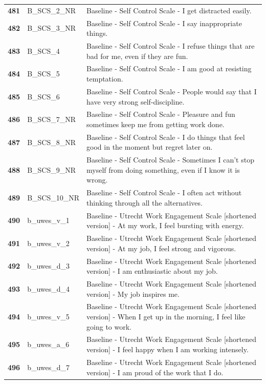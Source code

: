 \documentclass[
  letterpaper,
  DIV=11,
  numbers=noendperiod]{scrartcl}
\begin{document}
\begin{longtable}[t]{>{}cll}
\addlinespace
\textbf{481} & B\_SCS\_2\_NR & Baseline - Self Control Scale - I get distracted easily.\\
\textbf{482} & B\_SCS\_3\_NR & Baseline - Self Control Scale - I say inappropriate things.\\
\textbf{483} & B\_SCS\_4 & Baseline - Self Control Scale - I refuse things that are bad for me, even if they are fun.\\
\textbf{484} & B\_SCS\_5 & Baseline - Self Control Scale - I am good at resisting temptation.\\
\textbf{485} & B\_SCS\_6 & Baseline - Self Control Scale - People would say that I have very strong self-discipline.\\
\addlinespace
\textbf{486} & B\_SCS\_7\_NR & Baseline - Self Control Scale - Pleasure and fun sometimes keep me from getting work done.\\
\textbf{487} & B\_SCS\_8\_NR & Baseline - Self Control Scale - I do things that feel good in the moment but regret later on.\\
\textbf{488} & B\_SCS\_9\_NR & Baseline - Self Control Scale - Sometimes I can’t stop myself from doing something, even if I know it is wrong.\\
\textbf{489} & B\_SCS\_10\_NR & Baseline - Self Control Scale - I often act without thinking through all the alternatives.\\
\textbf{490} & b\_uwes\_v\_1 & Baseline - Utrecht Work Engagement Scale [shortened version] - At my work, I feel bursting with energy.\\
\addlinespace
\textbf{491} & b\_uwes\_v\_2 & Baseline - Utrecht Work Engagement Scale [shortened version] - At my job, I feel strong and vigorous.\\
\textbf{492} & b\_uwes\_d\_3 & Baseline - Utrecht Work Engagement Scale [shortened version] - I am enthusiastic about my job.\\
\textbf{493} & b\_uwes\_d\_4 & Baseline - Utrecht Work Engagement Scale [shortened version] - My job inspires me.\\
\textbf{494} & b\_uwes\_v\_5 & Baseline - Utrecht Work Engagement Scale [shortened version] - When I get up in the morning, I feel like going to work.\\
\textbf{495} & b\_uwes\_a\_6 & Baseline - Utrecht Work Engagement Scale [shortened version] - I feel happy when I am working intensely.\\
\addlinespace
\textbf{496} & b\_uwes\_d\_7 & Baseline - Utrecht Work Engagement Scale [shortened version] - I am proud of the work that I do.\\

\end{longtable}
\end{document}

